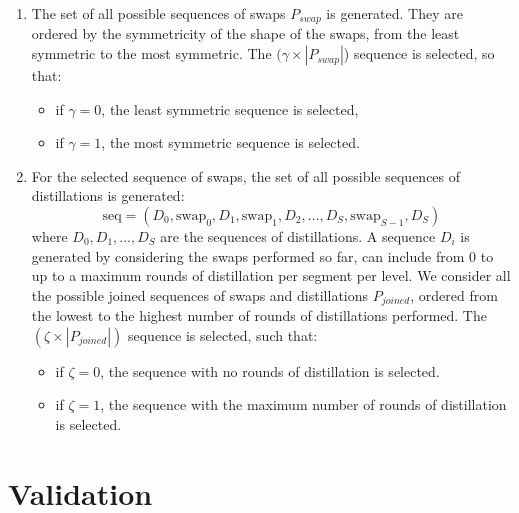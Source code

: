 \documentclass{article}
\begin{document}
\begin{enumerate}
    \item The set of all possible sequences of swaps $P_{swap}$ is generated. 
    They are ordered by the symmetricity of the shape of the swaps, from the least symmetric to the most symmetric. The \((\gamma \times |P_{swap}|\)) sequence is selected, so that:
    \begin{itemize}
        \item if \(\gamma = 0\), the least symmetric sequence is selected,
        \item if \(\gamma = 1\), the most symmetric sequence is selected.
    \end{itemize}
    \item For the selected sequence of swaps, the set of all possible sequences of distillations is generated:
    \[
    \text{seq} = (D_0, \text{swap}_0, D_1, \text{swap}_1, D_2, \ldots, D_S, \text{swap}_{S-1}, D_S)
    \]
    where \(D_0, D_1, \ldots, D_S\) are the sequences of distillations. 
    A sequence $D_i$ is generated by considering the swaps performed so far, can include from $0$ to up to a maximum rounds of distillation per segment per level.
    We consider all the possible joined sequences of swaps and distillations $P_{joined}$, ordered from the lowest to the highest  number of rounds of distillations performed. 
    The \((\zeta \times |P_{joined}|)\) sequence is selected, such that:
    \begin{itemize}
        \item if \(\zeta = 0\), the sequence with no rounds of distillation is selected.
        \item if \(\zeta = 1\), the sequence with the maximum number of rounds of distillation is selected.
    \end{itemize}
\end{enumerate}

\section*{Validation}
\end{document}

